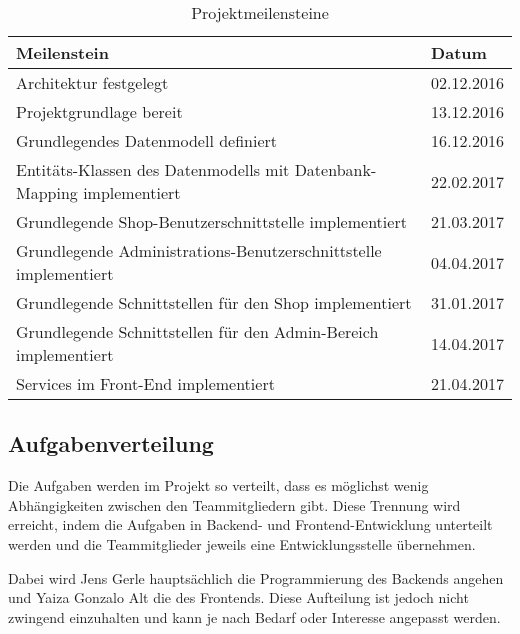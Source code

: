 \begin{table}[ht!]
\begin{tabular}{|p{}|p{}|}
	\hline 
	\textbf{Meilenstein} & \textbf{Datum} \\ 
	\hline 
	Architektur festgelegt & 02.12.2016 \\ 
	\hline 
	Projektgrundlage bereit & 13.12.2016 \\ 
	\hline 
	Grundlegendes Datenmodell definiert & 16.12.2016 \\ 
	\hline 
	Entitäts-Klassen des Datenmodells mit Datenbank-Mapping implementiert & 22.02.2017 \\ 
	\hline 
	Grundlegende Shop-Benutzerschnittstelle implementiert & 21.03.2017 \\ 
	\hline 
	Grundlegende Administrations-Benutzerschnittstelle implementiert & 04.04.2017 \\ 
	\hline 
	Grundlegende Schnittstellen für den Shop implementiert & 31.01.2017 \\ 
	\hline 
	Grundlegende Schnittstellen für den Admin-Bereich implementiert & 14.04.2017 \\ 
	\hline 
	Services im Front-End implementiert	& 21.04.2017 \\ 
	\hline 
\end{tabular} 
\caption{Projektmeilensteine} \label{tab:milestones}
\end{table}


\subsection{Aufgabenverteilung}
Die Aufgaben werden im Projekt so verteilt, dass es möglichst wenig Abhängigkeiten zwischen den Teammitgliedern gibt.
Diese Trennung wird erreicht, indem die Aufgaben in Backend- und Frontend-Entwicklung unterteilt werden und die Teammitglieder jeweils eine Entwicklungsstelle übernehmen.

Dabei wird Jens Gerle hauptsächlich die Programmierung des Backends angehen und Yaiza Gonzalo Alt die des Frontends.
Diese Aufteilung ist jedoch nicht zwingend einzuhalten und kann je nach Bedarf oder Interesse angepasst werden.















